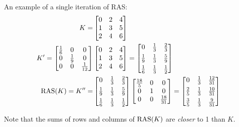 An example of a single iteration of RAS:
\begin{align}
    K=&\begin{bmatrix}
        0&2&4\\
        1&3&5\\
        2&4&6
    \end{bmatrix}\nonumber\\
    K'=
    \begin{bmatrix}
        \frac{1}{6}&0&0\\
        0&\frac{1}{9} &0\\
        0&0&\frac{1}{12}
    \end{bmatrix}
     &\begin{bmatrix}
        0&2&4\\
        1&3&5\\
        2&4&6
    \end{bmatrix}=
    \begin{bmatrix}
        0&\frac{1}{3}&\frac{2}{3}\\[4pt]
        \frac{1}{9}&\frac{1}{3}&\frac{5}{9}\\[4pt]
        \frac{1}{6}&\frac{1}{3}&\frac{1}{2}
    \end{bmatrix}\nonumber\\
    \operatorname{RAS}(K)=K''=
     &\begin{bmatrix}
         0&\frac{1}{3}&\frac{2}{3}\\[4pt]
         \frac{1}{9}&\frac{1}{3}&\frac{5}{9}\\[4pt]
        \frac{1}{6}&\frac{1}{3}&\frac{1}{2}
    \end{bmatrix}
    \begin{bmatrix}
         \frac{18}{5}&0&0\\
         0&1&0\\
         0&0&\frac{18}{31}
    \end{bmatrix}=
    \begin{bmatrix}
        0&\frac{1}{3}&\frac{12}{31}\\[4pt]
        \frac{2}{5}&\frac{1}{3}&\frac{10}{31}\\[4pt]
        \frac{3}{5}&\frac{1}{3}&\frac{9}{31}
    \end{bmatrix}
\end{align}

Note that the sums of rows and columns of $\operatorname{RAS}(K)$ are \emph{closer} to 1 than $K$.

